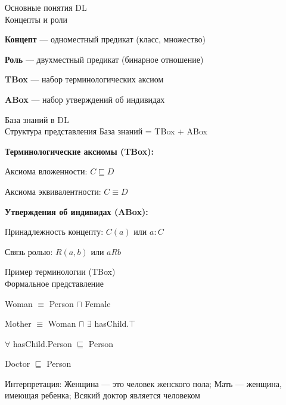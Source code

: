\begin{frame}{Основные понятия DL\\Концепты и роли}
	\topline
	\justifying
	\begin{textitemize}
		\item \textbf{Концепт} --- одноместный предикат (класс, множество)
		\item \textbf{Роль} --- двухместный предикат (бинарное отношение)
		\item \textbf{TBox} --- набор терминологических аксиом
		\item \textbf{ABox} --- набор утверждений об индивидах
	\end{textitemize}
\end{frame}

\begin{frame}{База знаний в DL\\Структура представления}
	\topline
	\justifying
	База знаний = TBox + ABox
	
	\textbf{Терминологические аксиомы (TBox):}
	\begin{textitemize}
		\item Аксиома вложенности: $C \sqsubseteq D$
		\item Аксиома эквивалентности: $C \equiv D$
	\end{textitemize}
	
	\textbf{Утверждения об индивидах (ABox):}
	\begin{textitemize}
		\item Принадлежность концепту: $C(a)$ или $a:C$
		\item Связь ролью: $R(a,b)$ или $aRb$
	\end{textitemize}
\end{frame}

\begin{frame}{Пример терминологии (TBox)\\Формальное представление}
	\topline
	\justifying
	\begin{textitemize}
		\item Woman $\equiv$ Person $\sqcap$ Female
		\item Mother $\equiv$ Woman $\sqcap$ $\exists$ hasChild.$\top$
		\item $\forall$ hasChild.Person $\sqsubseteq$ Person
		\item Doctor $\sqsubseteq$ Person
	\end{textitemize}
	
	\vspace{0.5cm}
	Интерпретация: Женщина --- это человек женского пола; Мать --- женщина, имеющая ребенка; Всякий доктор является человеком
\end{frame}

